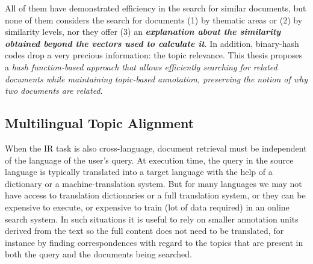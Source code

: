 All of them have demonstrated efficiency in the search for similar documents, but none of them considers the search for documents (1) by thematic areas or (2) by similarity levels, nor they offer (3) an \textbf{\textit{explanation about the similarity obtained beyond the vectors used to calculate it}}. In addition, binary-hash codes drop a very precious information: the topic relevance. This thesis proposes a \textit{hash function-based approach that allows efficiently searching for related documents while maintaining topic-based annotation, preserving the notion of why two documents are related}.


\subsection{Multilingual Topic Alignment}
\label{sec:multi-topic-alignment}

When the IR task is also cross-language, document retrieval must be independent of the language of the user's query. At execution time, the query in the source language is typically translated into a target language with the help of a dictionary or a machine-translation system. But for many languages we may not have access to translation dictionaries or a full translation system, or they can be expensive to execute, or expensive to train (lot of data required) in an online search system. In such situations it is useful to rely on smaller annotation units derived from the text so the full content does not need to be translated, for instance by finding correspondences with regard to the topics that are present in both the query and the documents being searched.

